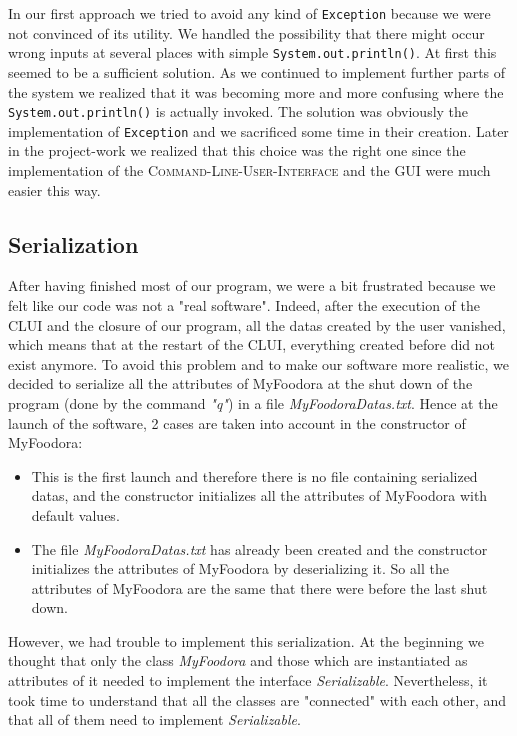In our first approach we tried to avoid any kind of \lstinline|Exception| because we were
not convinced of its utility. We handled the possibility that there might occur wrong inputs at
several places with simple \lstinline|System.out.println()|. At first this seemed to be a
sufficient solution. As we continued to implement further parts of the system we realized that it
was becoming more and more confusing where the \lstinline|System.out.println()| is actually 
invoked. The solution was obviously the implementation of \lstinline|Exception| and we sacrificed
some time in their creation. Later in the project-work we realized that this choice was the right
one since the implementation of the \textsc{Command-Line-User-Interface} and the \textsc{GUI} were
much easier this way.

\subsection{Serialization}
\label{sub:serialization}
After having finished most of our program, we were a bit frustrated because we felt like our code was not a "real software". Indeed, after the execution of the CLUI and the closure of our program, all the datas created by the user vanished, which means that at the restart of the CLUI, everything created before did not exist anymore. To avoid this problem and to make our software more realistic, we decided to serialize all the attributes of MyFoodora at the shut down of the program (done by the command \textit{"q"}) in a file \textit{MyFoodoraDatas.txt}.
Hence at the launch of the software, 2	cases are taken into account in the constructor of MyFoodora:
\begin{itemize}
	\item{} This is the first launch and therefore there is no file containing serialized datas, and the constructor initializes all the attributes of MyFoodora with default values.
	\item{} The file \textit{MyFoodoraDatas.txt} has already been created and the constructor initializes the attributes of MyFoodora by deserializing it. So all the attributes of MyFoodora are the same that there were before the last shut down. 	
\end{itemize}

However, we had trouble to implement this serialization. At the beginning we thought that only the class \textit{MyFoodora} and those which are instantiated as attributes of it needed to implement the interface \textit{Serializable}. Nevertheless, it took time to understand that all the classes are "connected" with each other, and that all of them need to implement \textit{Serializable}.

